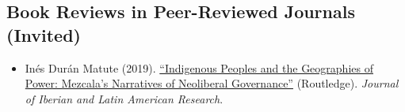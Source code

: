 

\subsection*{Book Reviews in Peer-Reviewed Journals (Invited)}

\begin{itemize}
	\item[\textcolor{gray}{\textbullet}] In\'es Dur\'an Matute (2019). \href{https://doi.org/10.1080/13260219.2019.1671679}{``Indigenous Peoples and the Geographies of Power: Mezcala's Narratives of Neoliberal Governance''} (Routledge). \emph{Journal of Iberian and Latin American Research}. %
\end{itemize}





